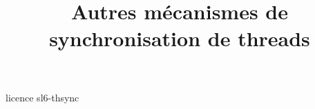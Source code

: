 \documentclass [xcolor=table] {beamer}
\title {Autres mécanismes de synchronisation de threads}
\begin{document}
 {licence}
 {sl6-thsync}
\end{document}
